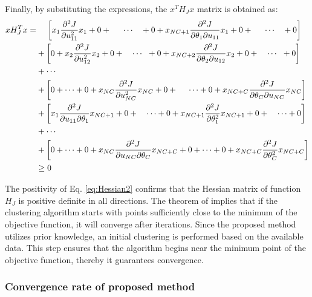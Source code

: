 \documentclass{article}
\begin{document}
Finally, by substituting the expressions, the $x^TH_Jx$ matrix is obtained as:
\begin{equation} \label{eq:Hessian2}
\begin{aligned}
x H_J^T x = & \hspace{1.2em} \left[ x_1 \frac{\partial^2 J}{\partial u_{11}^2} x_1 + 0 + \hspace{1.45em} \cdots \quad + 0 + x_{NC+1} \frac{\partial^2 J}{\partial \theta_1 \partial u_{11}} x_1 + 0 + \hspace{1.45em} \cdots \quad + 0 \right] \\
& + \left[ 0 + x_2 \frac{\partial^2 J}{\partial u_{12}^2} x_2 + 0 + \quad \cdots \hspace{0.6em} + 0 + x_{NC+2} \frac{\partial^2 J}{\partial \theta_2 \partial u_{12}} x_2 + 0 +\quad \cdots \hspace{0.6em} + 0 \right] \\ 
& + \cdots \\ \hfill
& + \left[ 0 + \cdots + 0 + x_{NC} \frac{\partial^2 J}{\partial u_{NC}^2} x_{NC} + 0 +\hspace{1.34em} \cdots + 0 + x_{NC+C} \frac{\partial^2 J}{\partial \theta_C \partial u_{NC}} x_{NC} \right] \\ \hfill
& + \left[ x_1 \frac{\partial^2 J}{\partial u_{11} \partial \theta_1} x_{NC+1} + 0 + \quad \cdots + 0 + x_{NC+1} \frac{\partial^2 J}{\partial \theta_1^2} x_{NC+1} + 0 + \quad \cdots + 0 \right] \\ \hfill
& + \cdots \\
& + \left[ 0 + \cdots + 0 + x_{NC} \frac{\partial^2 J}{\partial u_{NC} \partial \theta_C} x_{NC+C} + 0 + \cdots + 0 + x_{NC+C} \frac{\partial^2 J}{\partial \theta_C^2} x_{NC+C} \right] \\
& \geq 0
\end{aligned}
\end{equation}

The positivity of Eq. \ref{eq:Hessian2} confirms that the Hessian matrix of function $H_J$ is positive definite in all directions.
The theorem of \cite{hathaway1986local} implies that if the clustering algorithm starts with points sufficiently close to the minimum of the objective function, it will converge after iterations. Since the proposed method utilizes prior knowledge, an initial clustering is performed based on the available data. This step ensures that the algorithm begins near the minimum point of the objective function, thereby it guarantees convergence.

\subsubsection{Convergence rate of proposed method}
\end{document}
